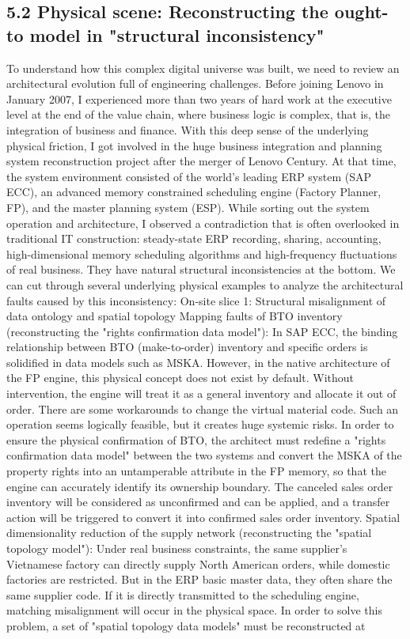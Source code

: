 \documentclass[11pt,a4paper]{article}
\begin{document}
\subsection*{5.2 Physical scene: Reconstructing the ought-to model in "structural inconsistency"}


To understand how this complex digital universe was built, we need to review an architectural evolution full of engineering challenges. Before joining Lenovo in January 2007, I experienced more than two years of hard work at the executive level at the end of the value chain, where business logic is complex, that is, the integration of business and finance. With this deep sense of the underlying physical friction, I got involved in the huge business integration and planning system reconstruction project after the merger of Lenovo Century. At that time, the system environment consisted of the world's leading ERP system (SAP ECC), an advanced memory constrained scheduling engine (Factory Planner, FP), and the master planning system (ESP). While sorting out the system operation and architecture, I observed a contradiction that is often overlooked in traditional IT construction: steady-state ERP recording, sharing, accounting, high-dimensional memory scheduling algorithms and high-frequency fluctuations of real business. They have natural structural inconsistencies at the bottom. We can cut through several underlying physical examples to analyze the architectural faults caused by this inconsistency: On-site slice 1: Structural misalignment of data ontology and spatial topology Mapping faults of BTO inventory (reconstructing the "rights confirmation data model"): In SAP ECC, the binding relationship between BTO (make-to-order) inventory and specific orders is solidified in data models such as MSKA. However, in the native architecture of the FP engine, this physical concept does not exist by default. Without intervention, the engine will treat it as a general inventory and allocate it out of order. There are some workarounds to change the virtual material code. Such an operation seems logically feasible, but it creates huge systemic risks. In order to ensure the physical confirmation of BTO, the architect must redefine a "rights confirmation data model" between the two systems and convert the MSKA of the property rights into an untamperable attribute in the FP memory, so that the engine can accurately identify its ownership boundary. The canceled sales order inventory will be considered as unconfirmed and can be applied, and a transfer action will be triggered to convert it into confirmed sales order inventory. Spatial dimensionality reduction of the supply network (reconstructing the "spatial topology model"): Under real business constraints, the same supplier's Vietnamese factory can directly supply North American orders, while domestic factories are restricted. But in the ERP basic master data, they often share the same supplier code. If it is directly transmitted to the scheduling engine, matching misalignment will occur in the physical space. In order to solve this problem, a set of "spatial topology data models" must be reconstructed at 
\end{document}

